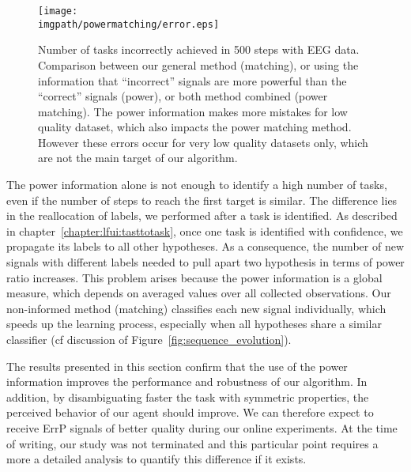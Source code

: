 \begin{figure}[!htbp]
\centering
\texttt{[image: \\imgpath/powermatching/error.eps]}
\caption{Number of tasks incorrectly achieved in 500 steps with EEG data. Comparison between our general method (matching), or using the information that ``incorrect'' signals are more powerful than the ``correct'' signals (power), or both method combined (power matching). The power information makes more mistakes for low quality dataset, which also impacts the power matching method. However these errors occur for very low quality datasets only, which are not the main target of our algorithm.}
\label{fig:nWrongEEG_powermatching}
\end{figure} 

The power information alone is not enough to identify a high number of tasks, even if the number of steps to reach the first target is similar. The difference lies in the reallocation of labels, we performed after a task is identified. As described in chapter~\ref{chapter:lfui:tasttotask}, once one task is identified with confidence, we propagate its labels to all other hypotheses. As a consequence, the number of new signals with different labels needed to pull apart two hypothesis in terms of power ratio increases. This problem arises because the power information is a global measure, which depends on averaged values over all collected observations. Our non-informed method (matching) classifies each new signal individually, which speeds up the learning process, especially when all hypotheses share a similar classifier (cf discussion of Figure~\ref{fig:sequence_evolution}).

\transition

The results presented in this section confirm that the use of the power information improves the performance and robustness of our algorithm. In addition, by disambiguating faster the task with symmetric properties, the perceived behavior of our agent should improve. We can therefore expect to receive ErrP signals of better quality during our online experiments. At the time of writing, our study was not terminated and this particular point requires a more a detailed analysis to quantify this difference if it exists.


